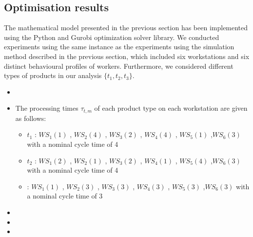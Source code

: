 \documentclass[review,12pt, 3p, times]{elsarticle}
\begin{document}
\subsection{Optimisation results}
The mathematical model presented in the previous section has been implemented using the Python and Gurobi optimization solver library. 
We conducted experiments using the same instance as the experiments using the simulation method described in the previous section, which included six workstations and six distinct behavioural profiles of workers. Furthermore, we considered  different types of products in our analysis $\{t_1, t_2, t_3\}$.
\begin{itemize}
    \item {}  
    \item  The processing times $\tau_{t,m}$ of each product type on each workstation are given as follows: 
        \begin{itemize}
            \item $t_1$ : $\textit{WS}_1(1)$ , $\textit{WS}_2(4)$ , $\textit{WS}_3(2)$ , $\textit{WS}_4(4)$ , $\textit{WS}_5(1)$ ,$\textit{WS}_6(3)$ with a nominal cycle time of 4
            \item $t_2$ : $\textit{WS}_1(2)$ , $\textit{WS}_2(1)$ , $\textit{WS}_3(2)$ , $\textit{WS}_4(1)$ , $\textit{WS}_5(4)$ ,$\textit{WS}_6(3)$ with a nominal cycle time of 4
            \item  {}: $\textit{WS}_1(1)$ , $\textit{WS}_2(3)$ , $\textit{WS}_3(3)$ , $\textit{WS}_4(3)$ , $\textit{WS}_5(3)$ ,$\textit{WS}_6(3)$ with a nominal cycle time of 3
        \end{itemize}
    \item {}      
    \item {}	
    \item {}  
\end{itemize}
\end{document}
